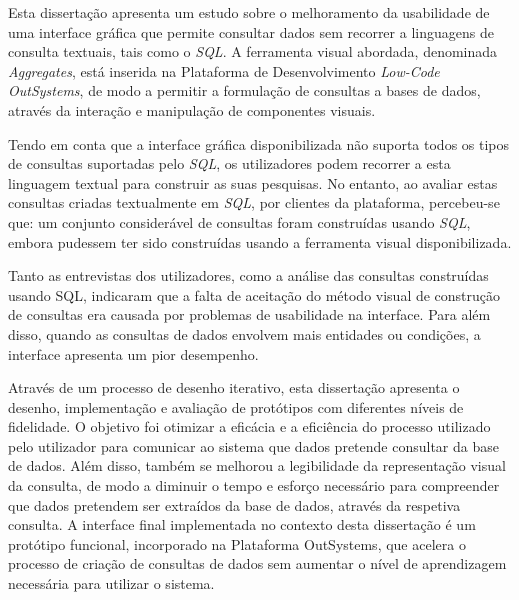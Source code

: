 Esta dissertação apresenta um estudo sobre o melhoramento da usabilidade de uma interface gráfica que permite consultar dados sem recorrer a linguagens de consulta textuais, tais como o \textit{SQL}. A ferramenta visual abordada, denominada \textit{Aggregates}, está inserida na Plataforma de Desenvolvimento \textit{Low-Code} \textit{OutSystems}, de modo a permitir a formulação de consultas a bases de dados, através da interação e manipulação de componentes visuais.

Tendo em conta que a interface gráfica disponibilizada não suporta todos os tipos de consultas suportadas pelo \textit{SQL}, os utilizadores podem recorrer a esta linguagem textual para construir as suas pesquisas. No entanto, ao avaliar estas consultas criadas textualmente em \textit{SQL}, por clientes da plataforma, percebeu-se que: um conjunto considerável de consultas foram construídas usando \textit{SQL}, embora pudessem ter sido construídas usando a ferramenta visual disponibilizada.

Tanto as entrevistas dos utilizadores, como a análise das consultas construídas usando SQL, indicaram que a falta de aceitação do método visual de construção de consultas era causada por problemas de usabilidade na interface. Para além disso, quando as consultas de dados envolvem mais entidades ou condições, a interface apresenta um pior desempenho.

Através de um processo de desenho iterativo, esta dissertação apresenta o desenho, implementação e avaliação de protótipos com diferentes níveis de fidelidade. O objetivo foi otimizar a eficácia e a eficiência do processo utilizado pelo utilizador para comunicar ao sistema que dados pretende consultar da base de dados. Além disso, também se melhorou a legibilidade da representação visual da consulta, de modo a diminuir o tempo e esforço necessário para compreender que dados pretendem ser extraídos da base de dados, através da respetiva consulta. A interface final implementada no contexto desta dissertação é um protótipo funcional, incorporado na Plataforma OutSystems, que acelera o processo de criação de consultas de dados sem aumentar o nível de aprendizagem necessária para utilizar o sistema.


